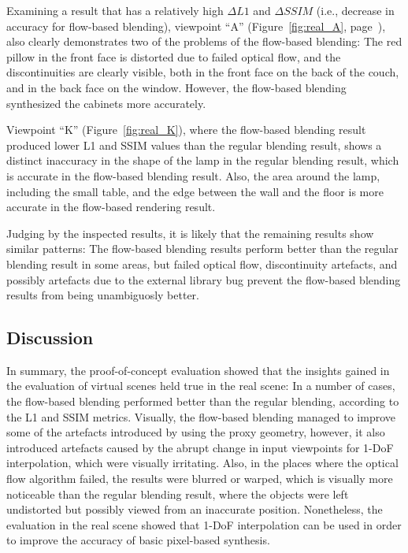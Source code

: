 Examining a result that has a relatively high $\Delta L1$ and $\Delta SSIM$ (i.e., decrease in accuracy for flow-based blending), viewpoint ``A'' (Figure~\ref{fig:real_A}, page~\pageref{fig:real_A}), also clearly demonstrates two of the problems of the flow-based blending: The red pillow in the front face is distorted due to failed optical flow, and the discontinuities are clearly visible, both in the front face on the back of the couch, and in the back face on the window. However, the flow-based blending synthesized the cabinets more accurately.

Viewpoint ``K'' (Figure~\ref{fig:real_K}), where the flow-based blending result produced lower L1 and SSIM values than the regular blending result, shows a distinct inaccuracy in the shape of the lamp in the regular blending result, which is accurate in the flow-based blending result. Also, the area around the lamp, including the small table, and the edge between the wall and the floor is more accurate in the flow-based rendering result.

Judging by the inspected results, it is likely that the remaining results show similar patterns: The flow-based blending results perform better than the regular blending result in some areas, but failed optical flow, discontinuity artefacts, and possibly artefacts due to the external library bug prevent the flow-based blending results from being unambiguosly better.

\subsection{Discussion}
In summary, the proof-of-concept evaluation showed that the insights gained in the evaluation of virtual scenes held true in the real scene: 
In a number of cases, the flow-based blending performed better than the regular blending, according to the L1 and SSIM metrics.
Visually, the flow-based blending managed to improve some of the artefacts introduced by using the proxy geometry, however, it also introduced artefacts caused by the abrupt change in input viewpoints for 1-DoF interpolation, which were visually irritating.
Also, in the places where the optical flow algorithm failed, the results were blurred or warped, which is visually more noticeable than the regular blending result, where the objects were left undistorted but possibly viewed from an inaccurate position.
Nonetheless, the evaluation in the real scene showed that 1-DoF interpolation can be used in order to improve the accuracy of basic pixel-based synthesis.


